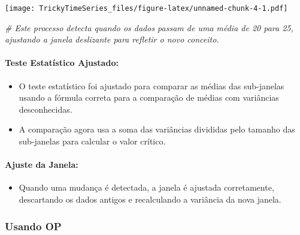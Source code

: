 \documentclass[
]{article}
\newenvironment{Shaded}{\begin{snugshade}}{\end{snugshade}}
\newcommand{\CommentTok}[1]{\textcolor[rgb]{0.56,0.35,0.01}{\textit{#1}}}
\providecommand{\tightlist}{%
  \setlength{\itemsep}{0pt}\setlength{\parskip}{0pt}}
\begin{document}
\texttt{[image: TrickyTimeSeries\_files/figure-latex/unnamed-chunk-4-1.pdf]}

\begin{Shaded}
\begin{Highlighting}[]
\CommentTok{\# Este processo detecta quando os dados passam de uma média de 20 para 25, ajustando a janela deslizante para refletir o novo conceito.}
\end{Highlighting}
\end{Shaded}

\hypertarget{teste-estatuxedstico-ajustado}{%
\paragraph{Teste Estatístico
Ajustado:}\label{teste-estatuxedstico-ajustado}}

\begin{itemize}
\tightlist
\item
  O teste estatístico foi ajustado para comparar as médias das
  sub-janelas usando a fórmula correta para a comparação de médias com
  variâncias desconhecidas.
\item
  A comparação agora usa a soma das variâncias divididas pelo tamanho
  das sub-janelas para calcular o valor crítico.
\end{itemize}

\hypertarget{ajuste-da-janela}{%
\paragraph{Ajuste da Janela:}\label{ajuste-da-janela}}

\begin{itemize}
\tightlist
\item
  Quando uma mudança é detectada, a janela é ajustada corretamente,
  descartando os dados antigos e recalculando a variância da nova
  janela.
\end{itemize}

\hypertarget{usando-op}{%
\subsubsection{Usando OP}\label{usando-op}}
\end{document}
